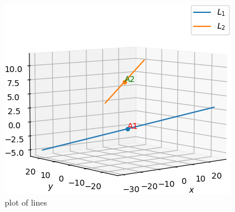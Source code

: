 \documentclass[journal,12pt,twocolumn]{IEEEtran}
\begin{document}
\begin{figure}[!ht]
\includegraphics[width=\columnwidth]{plot.png}
\caption{plot of lines}
\label{skew_lines}
\end{figure}
\end{document}
